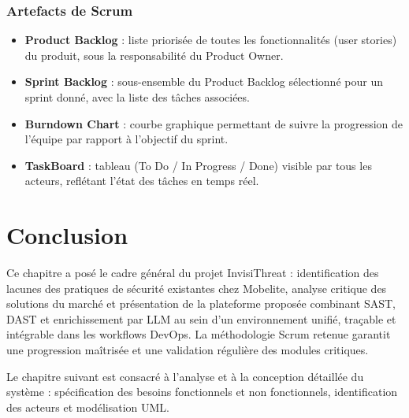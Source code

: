 \subsubsection{Artefacts de Scrum}
\begin{itemize}
  \item \textbf{Product Backlog} : liste priorisée de toutes les fonctionnalités (user stories) du produit, sous la responsabilité du Product Owner.
  \item \textbf{Sprint Backlog} : sous-ensemble du Product Backlog sélectionné pour un sprint donné, avec la liste des tâches associées.
  \item \textbf{Burndown Chart} : courbe graphique permettant de suivre la progression de l'équipe par rapport à l'objectif du sprint.
  \item \textbf{TaskBoard} : tableau (To Do / In Progress / Done) visible par tous les acteurs, reflétant l'état des tâches en temps réel.
\end{itemize}

\section{Conclusion}

Ce chapitre a posé le cadre général du projet InvisiThreat : identification des lacunes des pratiques de sécurité existantes chez Mobelite, analyse critique des solutions du marché et présentation de la plateforme proposée combinant SAST, DAST et enrichissement par LLM au sein d'un environnement unifié, traçable et intégrable dans les workflows DevOps. La méthodologie Scrum retenue garantit une progression maîtrisée et une validation régulière des modules critiques.

Le chapitre suivant est consacré à l'analyse et à la conception détaillée du système : spécification des besoins fonctionnels et non fonctionnels, identification des acteurs et modélisation UML.